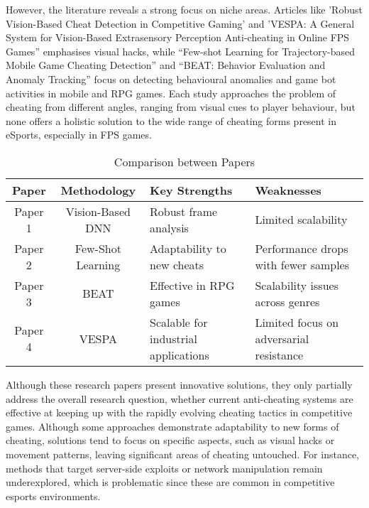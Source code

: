 \documentclass[a4paper, 12pt]{article}
\begin{document}
However, the literature reveals a strong focus on niche areas. Articles like 'Robust Vision-Based Cheat Detection in Competitive Gaming' and 'VESPA: A General System for Vision-Based Extrasensory Perception Anti-cheating in Online FPS Games” emphasises visual hacks, while “Few-shot Learning for Trajectory-based Mobile Game Cheating Detection” and “BEAT: Behavior Evaluation and Anomaly Tracking” focus on detecting behavioural anomalies and game bot activities in mobile and RPG games. Each study approaches the problem of cheating from different angles, ranging from visual cues to player behaviour, but none offers a holistic solution to the wide range of cheating forms present in eSports, especially in FPS games.

\begin{table}[ht]
    \centering
    \begin{tabular}{cc>{\centering\arraybackslash}p{4cm}>{\centering\arraybackslash}p{4cm}}
        \hline
        \textbf{Paper} & \textbf{Methodology} & \textbf{Key Strengths} & \textbf{Weaknesses} \\
        \hline
        Paper 1 & Vision-Based DNN & Robust frame analysis & Limited scalability \\
        Paper 2 & Few-Shot Learning & Adaptability to new cheats & Performance drops with fewer samples \\
        Paper 3 & BEAT & Effective in RPG games & Scalability issues across genres \\
        Paper 4 & VESPA & Scalable for industrial applications & Limited focus on adversarial resistance \\
        \hline
    \end{tabular}
    \caption{Comparison between Papers}
    \label{tab:comparison_label}
\end{table}

Although these research papers present innovative solutions, they only partially address the overall research question, whether current anti-cheating systems are effective at keeping up with the rapidly evolving cheating tactics in competitive games. Although some approaches demonstrate adaptability to new forms of cheating, solutions tend to focus on specific aspects, such as visual hacks or movement patterns, leaving significant areas of cheating untouched. For instance, methods that target server-side exploits or network manipulation remain underexplored, which is problematic since these are common in competitive esports environments.
\end{document}
